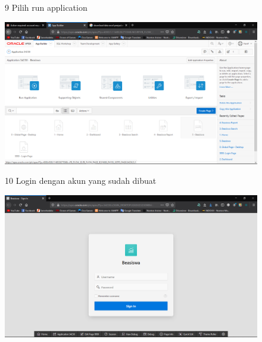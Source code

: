 \begin{enumerate}
\begin{figure}[!htbp]
\item[9] Pilih run  application
\begin{center}
    \includegraphics[scale=0.3]{section/Screenshot(36).png}
    \end{center}
    \end{figure}
    
\begin{figure}[!htbp]
\item[10] Login dengan akun yang sudah dibuat
\begin{center}
    \includegraphics[scale=0.3]{section/Screenshot(37).png}
    \end{center}
    \end{figure}
    

\end{enumerate}
